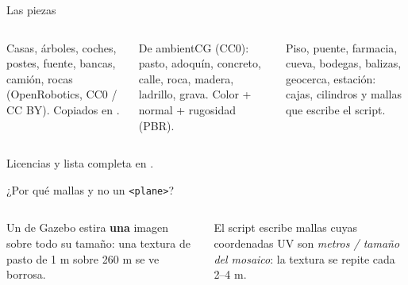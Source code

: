 \begin{frame}{Las piezas}
  \begin{columns}[t]
    \begin{idea}[title={\small\bfseries Modelos de Fuel},coltitle=black,colbacktitle=azulclaro]
      \scriptsize Casas, árboles, coches, postes, fuente, bancas, camión, rocas (OpenRobotics,
      CC0 / CC BY). Copiados en .
    \end{idea}
    \begin{idea}[title={\small\bfseries Texturas},coltitle=black,colbacktitle=azulclaro]
      \scriptsize De ambientCG (CC0): pasto, adoquín, concreto, calle, roca, madera, ladrillo, grava.
      Color + normal + rugosidad (PBR).
    \end{idea}
    \begin{idea}[title={\small\bfseries Lo propio},coltitle=black,colbacktitle=azulclaro]
      \scriptsize Piso, puente, farmacia, cueva, bodegas, balizas, geocerca, estación: cajas,
      cilindros y mallas que escribe el script.
    \end{idea}
  \end{columns}
  \vspace{0.5em}
  \small Licencias y lista completa en .
\end{frame}

\begin{frame}{¿Por qué mallas y no un \texttt{<plane>}?}
  \begin{columns}[c]
    \small
    Un  de Gazebo estira \textbf{una} imagen sobre todo su tamaño: una textura de
    pasto de 1 m sobre 260 m se ve borrosa.
    \vspace{0.3em}

    El script escribe mallas  cuyas coordenadas UV son \emph{metros / tamaño del mosaico}:
    la textura se repite cada 2--4 m.
  \end{columns}
\end{frame}

